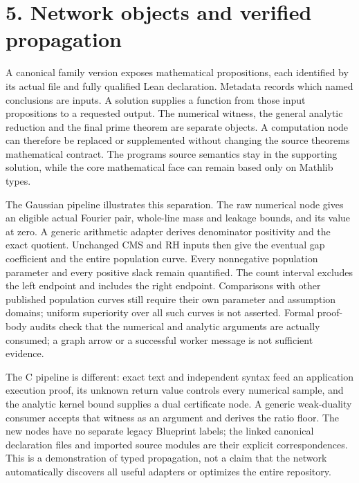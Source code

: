 \documentclass[11pt]{article}
\begin{document}
\begin{center}


\ifdim\wd\eqbox>\linewidth\resizebox{\linewidth}{!}{\usebox{\eqbox}}\else\usebox{\eqbox}\fi

\end{center}

\section{5. Network objects and verified propagation}

A canonical family version exposes mathematical propositions, each identified by its actual file and fully qualified Lean declaration. Metadata records which named conclusions are inputs. A solution supplies a function from those input propositions to a requested output. The numerical witness, the general analytic reduction and the final prime theorem are separate objects. A computation node can therefore be replaced or supplemented without changing the source theorems mathematical contract. The programs source semantics stay in the supporting solution, while the core mathematical face can remain based only on Mathlib types.


The Gaussian pipeline illustrates this separation. The raw numerical node gives an eligible actual Fourier pair, whole-line mass and leakage bounds, and its value at zero. A generic arithmetic adapter derives denominator positivity and the exact quotient. Unchanged CMS and RH inputs then give the eventual gap coefficient and the entire population curve. Every nonnegative population parameter and every positive slack remain quantified. The count interval excludes the left endpoint and includes the right endpoint. Comparisons with other published population curves still require their own parameter and assumption domains; uniform superiority over all such curves is not asserted. Formal proof-body audits check that the numerical and analytic arguments are actually consumed; a graph arrow or a successful worker message is not sufficient evidence.


The C pipeline is different: exact text and independent syntax feed an application execution proof, its unknown return value controls every numerical sample, and the analytic kernel bound supplies a dual certificate node. A generic weak-duality consumer accepts that witness as an argument and derives the ratio floor. The new nodes have no separate legacy Blueprint labels; the linked canonical declaration files and imported source modules are their explicit correspondences. This is a demonstration of typed propagation, not a claim that the network automatically discovers all useful adapters or optimizes the entire repository.
\end{document}
